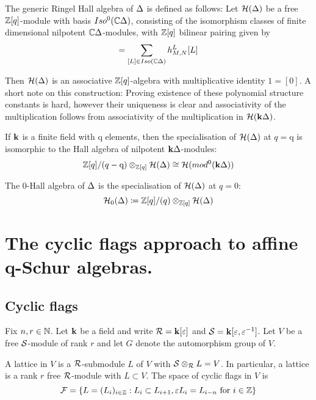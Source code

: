\documentclass[a4paper, 11pt]{report}
\begin{document}
The generic Ringel Hall algebra of $\Delta$ is defined as follows: Let $\mathcal{H}(\Delta)$ be a free $\mathbb{Z}[q]$-module with basis $Iso^0(\mathbb{C}\Delta)$, consisting of the isomorphism classes of finite dimensional nilpotent $\mathbb{C}\Delta$-modules, with $\mathbb{Z}[q]$ bilinear pairing given by
\begin{equation*}
[M][N] = \sum_{[L]\in Iso(\complex\cyclic)} h_{M,N}^L [L]
\end{equation*}

Then $\mathcal{H}(\Delta)$ is an associative $\mathbb{Z}[q]$-algebra with multiplicative identity $1 = [0]$. A short note on this construction: Proving existence of these polynomial structure constants is hard, however their uniqueness is clear and associativity of the multiplication follows from associativity of the multiplication in $\mathcal{H}(\mathbf{k}\Delta)$.

If $\mathbf{k}$ is a finite field with $\mathrm{q}$ elements, then the specialisation of $\mathcal{H}(\Delta)$ at $q=\mathrm{q}$ is isomorphic to the Hall algebra of nilpotent $\mathbf{k}\Delta$-modules:
\begin{equation*}
\mathbb{Z}[q]/{(q-\mathrm{q})}\otimes_{\mathbb{Z}[q]} \mathcal{H}(\Delta) \cong \mathcal{H}(mod^0(\mathbf{k}\Delta))
\end{equation*}

The 0-Hall algebra of $\Delta$ is the specialisation of $\mathcal{H}(\Delta)$ at $q=0$:
\begin{equation*}
\mathcal{H}_0(\Delta) \coloneqq \mathbb{Z}[q]/{(q)}\otimes_{\mathbb{Z}[q]} \mathcal{H}(\Delta)
\end{equation*}


\chapter{The cyclic flags approach to affine q-Schur algebras.}

\section{Cyclic flags}

Fix $n,r\in\mathbb{N}$. Let $\mathbf{k}$ be a field and write $\mathcal{R} = \mathbf{k}[\varepsilon]$ and $\mathcal{S} = \mathbf{k}[\varepsilon,\varepsilon^{-1}]$. Let $V$ be a free $\mathcal{S}$-module of rank $r$ and let $G$ denote the automorphism group of $V$.

A lattice in $V$ is a $\mathcal{R}$-submodule $L$ of $V$ with $\mathcal{S}\otimes_{\mathcal{R}} L = V$. In particular, a lattice is a rank $r$ free $\mathcal{R}$-module with $L\subset V$. The space of cyclic flags in $V$ is
\begin{equation*}
\mathcal{F} = \{L=(L_i)_{i\in\mathbb{Z}}:L_i\subset L_{i+1}, \varepsilon L_i = L_{i-n}\text{ for } i\in\mathbb{Z}\}
\end{equation*}
\end{document}
